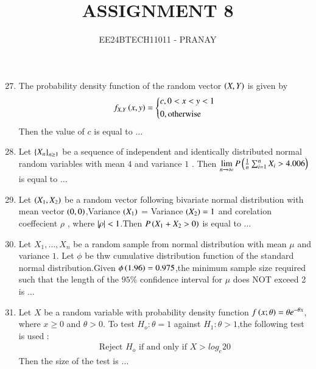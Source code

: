 \documentclass[journal,12pt,onecolumn]{IEEEtran}
\theoremstyle{remark}
\begin{document}

\vspace{3cm}

\title{ASSIGNMENT 8}
\author{EE24BTECH11011 - PRANAY}
\maketitle

\bigskip

\renewcommand{\thefigure}{\theenumi}
\renewcommand{\thetable}{\theenumi}
\begin{enumerate}\setcounter{enumi}{26}
\item The probability density function of the random vector $\left(X,Y\right)$ is given by
\begin{align}
	f_{X,Y}\brak{x,y} = \begin{cases*} c, 0<x<y<1 \\ 0, \text{otherwise} \end{cases*}
\end{align}
Then the value of $c$ is equal to $\dots$
\item Let $\left\{X_n\right\}_{n \geq 1}$ be a sequence of independent and identically distributed normal random variables with mean $4$ and variance $1$ . Then $\lim\limits_{n \rightarrow \infty} P\left(\frac{1}{n}\sum_{i=1}^n X_i > 4.006\right)$ is equal to $\dots$
\item Let $\left(X_1,X_2\right)$ be a random vector following bivariate normal distribution with mean vector $\left(0,0\right)$,Variance $\left(X_1\right)$ = Variance $\left(X_2\right) = 1$ and corelation coeffecient $\rho$ , where $\left\vert\rho\right\vert <1$.Then $P\left(X_1 + X_2 > 0\right)$ is equal to $\dots$
\item Let $X_1 , \dots , X_n$ be a random sample from normal distribution with mean $\mu$ and variance $1$. Let $\phi$ be thw cumulative distribution function of the standard normal distribution.Given  $\phi\left(1.96\right) = 0.975$,the minimum sample size required such that the length of the $95\%$ confidence interval for $\mu$ does NOT exceed 2 is $\dots$
\item Let $X$ be a random variable with probability density function $f\left(x;\theta\right) = \theta e^{-\theta x}$, where $x \geq 0$ and $\theta>0$. To test $H_o \colon \theta = 1$ against $H_1 \colon \theta > 1$,the following test is used :
	\begin{align}
		\text{Reject } H_o \text{ if and only if } X>log_e 20
\end{align}
Then the size of the test is $\dots$

\end{enumerate}
\end{document}
